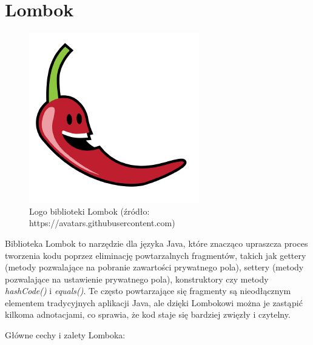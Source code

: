 \section{Lombok}
\begin{figure}[h]
    \centering
    \includegraphics[width=0.4\linewidth]{./img/lombok.png}
    \caption{Logo biblioteki Lombok (źródło: https://avatars.githubusercontent.com)}
    \label{fig:Lombok}
\end{figure}
Biblioteka Lombok to narzędzie dla języka Java, które znacząco upraszcza proces tworzenia kodu poprzez eliminację powtarzalnych fragmentów, takich jak gettery (metody pozwalające na pobranie zawartości prywatnego pola), settery (metody pozwalające na ustawienie prywatnego pola), konstruktory czy metody \textit{hashCode()} i \textit{equals()}. Te często powtarzające się fragmenty są nieodłącznym elementem tradycyjnych aplikacji Java, ale dzięki Lombokowi można je zastąpić kilkoma adnotacjami, co sprawia, że kod staje się bardziej zwięzły i czytelny.

Główne cechy i zalety Lomboka:

